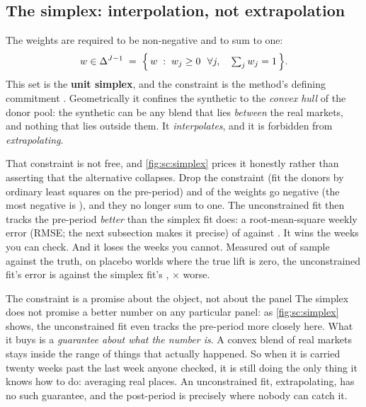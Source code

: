 \subsection*{The simplex: interpolation, not extrapolation}

The weights are required to be non-negative and to sum to one:
%
\begin{equation}
  w \in \simplex \;=\; \Big\{\, w \;:\; w_j \ge 0 \ \ \forall j, \quad \textstyle\sum_j w_j = 1 \,\Big\}.
  \label{eq:sc:vocab_simplex}
\end{equation}
%
This set is the \textbf{unit simplex}, and the constraint is the method's defining commitment
\citep{abadie2010, abadie2021}. Geometrically it confines the synthetic to the \emph{convex hull}
of the donor pool: the synthetic can be any blend that lies \emph{between} the real markets, and
nothing that lies outside them. It \emph{interpolates}, and it is forbidden from
\emph{extrapolating}.

That constraint is not free, and \cref{fig:sc:simplex} prices it honestly rather than asserting
that the alternative collapses. Drop the constraint (fit the donors by ordinary least squares
on the pre-period) and \nbSevenUncNNegative{} of the \nbSevenNDonors{} weights go negative (the
most negative is \nbSevenUncWMin{}), and they no longer sum to one. The unconstrained fit then
tracks the pre-period \emph{better} than the simplex fit does: a root-mean-square weekly error
(RMSE; the next subsection makes it precise) of
\keur{\nbSevenRmspeUnconstrained} against \keur{\nbSevenRmspeSimplex}. It wins the weeks you can
check. And it loses the weeks you cannot. Measured out of sample against the truth, on placebo
worlds where the true lift is zero, the unconstrained fit's error is
\keur{\nbSevenHullOosUnconstrained} against the simplex fit's \keur{\nbSevenHullOosSimplex},
\nbSevenHullOosRatio$\times$ worse.

\begin{intuition}{The constraint is a promise about the object, not about the panel}
The simplex does not promise a better number on any particular panel: as \cref{fig:sc:simplex}
shows, the unconstrained fit even tracks the pre-period more closely here. What it buys is a
\emph{guarantee about what the number is}. A convex blend of real markets stays
inside the range of things that actually happened. So when it is carried twenty weeks past the
last week anyone checked, it is still doing the only thing it knows how to do: averaging real
places. An unconstrained fit, extrapolating, has no such guarantee, and the post-period is
precisely where nobody can catch it.
\end{intuition}

